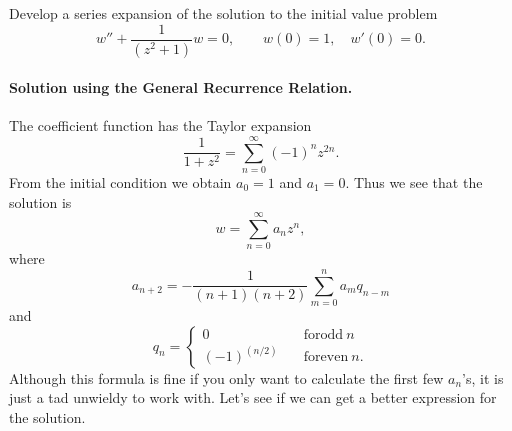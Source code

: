 \begin{Example}
  Develop a series expansion of the solution to the initial value problem
  \[ w'' + \frac{1}{(z^2+1)} w = 0, \qquad w(0) = 1, \quad w'(0) = 0.\]

  \paragraph{Solution using the General Recurrence Relation.}
  The coefficient function has the Taylor expansion
  \[ \frac{1}{1+z^2} = \sum_{n=0}^\infty (-1)^n z^{2n}. \]
  From the initial condition we obtain $a_0 = 1$ and $a_1 = 0$.
  Thus we see that the solution is
  \[ w = \sum_{n=0}^\infty a_n z^n, \]
  where
  \[ a_{n+2} = -\frac{1}{(n+1)(n+2)} \sum_{m=0}^n a_m q_{n-m} \]
  and 
  \[ q_n =        \begin{cases}
    0 \quad &\mathrm{for odd}\ n \\
    (-1)^{(n/2)} \quad &\mathrm{for even}\ n.
  \end{cases}
  \]
  Although this formula is fine if you only want to calculate the first 
  few $a_n$'s, it is just a tad unwieldy to work with.  Let's see if we
  can get a better expression for the solution.


\end{Example}
